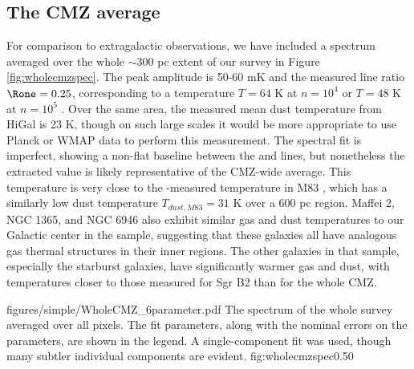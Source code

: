 \subsection{The CMZ average}
For comparison to extragalactic observations, we have included a spectrum
averaged over the whole $\sim300$ pc extent of our survey in Figure
\ref{fig:wholecmzspec}.  The peak amplitude is 50-60 mK and the measured
line ratio $\Rone = 0.25$, corresponding to a temperature $T=64$ K at $n=10^4$
\percc or $T=48$ K at $n=10^5$ \percc.  
Over the same area, the measured mean dust temperature from HiGal is 23 K,
though on such large scales it would be more appropriate to use Planck or WMAP
data to perform this measurement.
The spectral fit is imperfect, showing a non-flat baseline between the
\threetwoone and \threetwotwo lines, but nonetheless the extracted value is
likely representative of the CMZ-wide average.  This temperature is very close
to the \ammonia-measured temperature in M83 \citep[56 K;][]{Mangum2013a}, which
has a similarly low dust temperature $T_{dust,M83} = 31$ K over a 600 pc
region.  Maffei 2, NGC 1365, and NGC 6946 also exhibit similar gas and dust
temperatures to our Galactic center in the \citet{Mangum2013a} sample,
suggesting that these galaxies all have analogous gas thermal structures in
their inner regions.  The other galaxies in that sample, especially the
starburst galaxies, have significantly warmer gas and dust, with temperatures
closer to those measured for Sgr B2 than for the whole CMZ.


\Figure
{figures/simple/WholeCMZ_6parameter.pdf}
{The spectrum of the whole survey averaged over all pixels.
The fit parameters, along with the nominal errors on the parameters,
are shown in the legend.  A single-component fit was used, though many
subtler individual components are evident.}
{fig:wholecmzspec}{0.5}{0}


